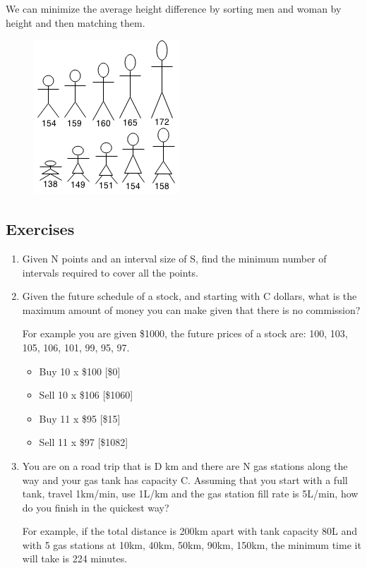 \documentclass[11pt,oneside]{book}
\makeatletter
\def\maxwidth#1{\ifdim\Gin@nat@width>#1 #1\else\Gin@nat@width\fi}
\makeatother
\begin{document}
We can minimize the average height difference by sorting men and woman by height and then matching them.

\vspace{5px}\begin{figure}[H]\centering
        \includegraphics[width=0.66\maxwidth{\textwidth}]{couplematch2.png}
        \end{figure}

\subsection{Exercises}

\begin{enumerate}
\item Given N points and an interval size of S, find the minimum number of intervals required to cover all the points.
\item Given the future schedule of a stock, and starting with C dollars, what is the maximum amount of money you can make given that there is no commission?

For example you are given \$1000, the future prices of a stock are: 100, 103, 105, 106, 101, 99, 95, 97.

\begin{itemize}
\item Buy 10 x \$100 [\$0]
\item Sell 10 x \$106 [\$1060]
\item Buy 11 x \$95 [\$15]
\item Sell 11 x \$97 [\$1082]
\end{itemize}
\item You are on a road trip that is D km and there are N gas stations along the way and your gas tank has capacity C. Assuming that you start with a full tank, travel 1km/min, use 1L/km and the gas station fill rate is 5L/min, how do you finish in the quickest way?

For example, if the total distance is 200km apart with tank capacity 80L and with 5 gas stations at 10km, 40km, 50km, 90km, 150km, the minimum time it will take is 224 minutes.
\end{enumerate}
\end{document}
